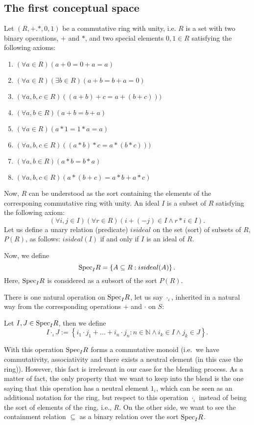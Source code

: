 \subsection{The first conceptual space}
Let $(R,+.*,0,1)$ be a commutative ring with unity, i.e. $R$ is a set with two binary operations, $+$ and $*$, and two special elements $0,1\in R$ satisfying the following axioms:
\begin{enumerate}
\item $(\forall a\in R)(a+0=0+a=a)$
\item $(\forall a\in R)(\exists b\in R)(a+b=b+a=0)$
\item $(\forall a,b,c \in R)((a+b)+c=a+(b+c)))$
\item $(\forall a,b \in R)(a+b=b+a)$
\item $(\forall a\in R)(a*1=1*a=a)$
\item $(\forall a,b,c \in R)((a*b)*c=a*(b*c)))$
\item $(\forall a,b \in R)(a*b=b*a)$
\item $(\forall a,b,c \in R)(a*(b+c)=a*b+a*c)$
\end{enumerate}
Now, $R$ can be understood as the sort containing the elements of the corresponing commutative ring with unity.
An ideal $I$ is a subset of $R$ satisfying the following axiom:
\[(\forall i,j\in I)(\forall r\in R)(i+(-j)\in I \wedge r*i\in I).\]
\newline\indent 
Let us define a unary relation (predicate) $isideal$ on the set (sort) of subsets of $R$, $P(R)$, as follows:
$isideal(I)$ if and only if $I$ is an ideal of $R$.

Now, we define
\[{\rm Spec}_IR=\left\{A\subseteq R: isideal(A) \right\}.\]
Here, ${\rm Spec}_IR$ is considered as a subsort of the sort $P(R)$.

There is one natural operation on ${\rm Spec}_IR$, let us say $\cdot_{\iota}$, inherited in a natural way from the corresponding operations $+$ and $\cdot$ on $S$:

 Let $I,J\in {\rm Spec}_IR$, then we define 
%
\[I\cdot_{\iota} J:=\left\{i_1\cdot j_1+...+i_n\cdot j_n:n \in \mathbb{N} \wedge i_k\in I \wedge j_k\in J \right\}.\]

With this operation ${\rm Spec}_IR$ forms a commutative monoid (i.e.\
we have commutativity, associativity and there exists a neutral
element (in this case the ring)). However, this fact is irrelevant in
our case for the blending process. As a matter of fact, the only
property that we want to keep into the blend is the one saying that
this operation has a neutral element $1_{\iota}$, which can be seen as
an additional notation for the ring, but respect to this operation
$\cdot_{\iota}$ instead of being the sort of elements of the ring,
i.e., $R$.  \newline\indent On the other side, we want to see the
containment relation $\subseteq$ as a binary relation over the sort
${\rm Spec}_IR$.

